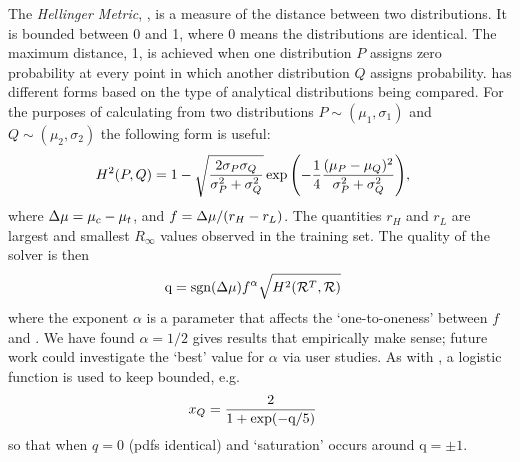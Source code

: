 The \emph{Hellinger Metric}, \hell{},  is a measure of the distance between two distributions. It is bounded between 0 and 1, where 0 means the distributions are identical. The maximum distance, 1, is achieved when one distribution $P$ assigns zero probability at every point in which another distribution $Q$ assigns probability. \hell{} has different forms based on the type of analytical distributions being compared. For the purposes of calculating \xQ{} from two distributions $P \sim (\mu_1,\sigma_1)$ and $Q\sim(\mu_2,\sigma_2)$ the following form is useful:
\begin{align}
    H^2(P,Q) &= 1-\sqrt{\frac{2\sigma_P\sigma_Q}{\sigma_P^2+\sigma_Q^2}}\exp{\left(-\frac{1}{4}\frac{(\mu_P-\mu_Q)^2}{\sigma_P^2+\sigma_Q^2}\right)},
\end{align}
where $\Delta \mu= \mu_c-\mu_t$, and $f = \Delta \mu/(r_H-r_L)$. The quantities $r_H$ and $r_L$ are largest and smallest $R_{\infty}$ values observed in the \surrogate{} training set. The quality of the solver is then
\begin{align}
    \text{q} &= \text{sgn}(\dmu)f^{\alpha}\sqrt{H^{2}(\rwdtrust,\rwd)} \label{eq:q}
\end{align}
\noindent where the exponent $\alpha$ is a parameter that affects the `one-to-oneness' between $f$ and \hell{}. 
We have found $\alpha=1/2$ gives results that empirically make sense; future work could investigate the `best' value for $\alpha$ via user studies. 
%
As with \xO{}, a logistic function is used to keep \xQ{} bounded, e.g. %
    \begin{align}
        \xQ &= \frac{2}{1+\exp(-\text{q}/5)}\label{eq:xQ}
    \end{align}
so that  when $q=0$ (pdfs identical) and `saturation' occurs around $\text{q}=\pm1$. 

